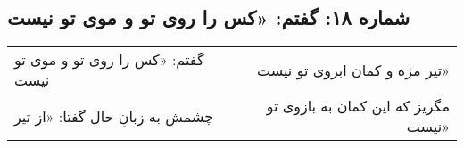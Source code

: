 \begin{center}
\section*{شماره ۱۸: گفتم: «کس را روی تو و موی تو نیست}
\label{sec:018}
\begin{longtable}{l p{0.5cm} r}
گفتم: «کس را روی تو و موی تو نیست
&&
تیر مژه و کمان ابروی تو نیست»
\\
چشمش به زبانِ حال گفتا: «از تیر
&&
مگریز که این کمان به بازوی تو نیست»
\\
\end{longtable}
\end{center}

